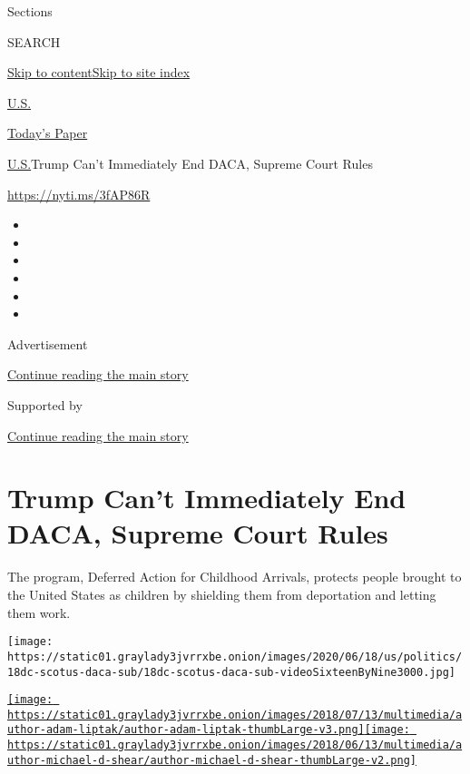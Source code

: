 Sections

SEARCH

\protect\hyperlink{site-content}{Skip to
content}\protect\hyperlink{site-index}{Skip to site index}

\href{https://www.nytimes3xbfgragh.onion/section/us}{U.S.}

\href{https://myaccount.nytimes3xbfgragh.onion/auth/login?response_type=cookie\&client_id=vi}{}

\href{https://www.nytimes3xbfgragh.onion/section/todayspaper}{Today's
Paper}

\href{/section/us}{U.S.}\textbar{}Trump Can't Immediately End DACA,
Supreme Court Rules

\url{https://nyti.ms/3fAP86R}

\begin{itemize}
\item
\item
\item
\item
\item
\item
\end{itemize}

Advertisement

\protect\hyperlink{after-top}{Continue reading the main story}

Supported by

\protect\hyperlink{after-sponsor}{Continue reading the main story}

\hypertarget{trump-cant-immediately-end-daca-supreme-court-rules}{%
\section{Trump Can't Immediately End DACA, Supreme Court
Rules}\label{trump-cant-immediately-end-daca-supreme-court-rules}}

The program, Deferred Action for Childhood Arrivals, protects people
brought to the United States as children by shielding them from
deportation and letting them work.

\texttt{[image: https://static01.graylady3jvrrxbe.onion/images/2020/06/18/us/politics/18dc-scotus-daca-sub/18dc-scotus-daca-sub-videoSixteenByNine3000.jpg]}

\href{https://www.nytimes3xbfgragh.onion/by/adam-liptak}{\texttt{[image: https://static01.graylady3jvrrxbe.onion/images/2018/07/13/multimedia/author-adam-liptak/author-adam-liptak-thumbLarge-v3.png]}}\href{https://www.nytimes3xbfgragh.onion/by/michael-d-shear}{\texttt{[image: https://static01.graylady3jvrrxbe.onion/images/2018/06/13/multimedia/author-michael-d-shear/author-michael-d-shear-thumbLarge-v2.png]}}

